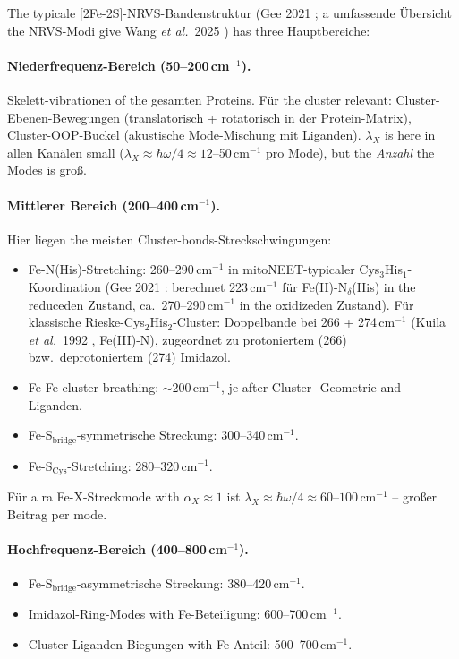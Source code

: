 \documentclass[11pt,a4paper,twoside]{article}
\theoremstyle{remark}
\begin{document}
The typicale [2Fe-2S]-NRVS-Bandenstruktur (Gee 2021 \cite{Gee2021}; 
a umfassende \"Ubersicht the NRVS-Modi give Wang \emph{et al.}\ 
2025 \cite{Wang2025}) has three Hauptbereiche:

\paragraph{Niederfrequenz-Bereich (50--200\,cm$^{-1}$).}
Skelett-vibrationen of the gesamten Proteins. F\"ur the cluster relevant:
Cluster-Ebenen-Bewegungen (translatorisch + rotatorisch in der
Protein-Matrix), Cluster-OOP-Buckel (akustische Mode-Mischung mit
Liganden). $\lambda_X$ is here in allen Kan\"alen small
($\lambda_X \approx \hbar\omega/4 \approx 12$--50\,cm$^{-1}$ pro
Mode), but the \emph{Anzahl} the Modes is gro{\ss}.

\paragraph{Mittlerer Bereich (200--400\,cm$^{-1}$).}
Hier liegen the meisten Cluster-bonds-Streckschwingungen:
\begin{itemize}\setlength{\itemsep}{0pt}
  \item Fe-N(His)-Stretching:
        260--290\,cm$^{-1}$ in mitoNEET-typicaler Cys$_3$His$_1$-
        Koordination (Gee 2021 \cite{Gee2021}: berechnet 223\,cm$^{-1}$
        f\"ur Fe(II)-N$_\delta$(His) in the reduceden Zustand, ca.\
        270--290\,cm$^{-1}$ in the oxidizeden Zustand). F\"ur klassische
        Rieske-Cys$_2$His$_2$-Cluster: Doppelbande bei 266 + 274\,cm$^{-1}$
        (Kuila \emph{et al.}\ 1992 \cite{Kuila1992}, Fe(III)-N), zugeordnet
        zu protoniertem (266) bzw.\ deprotoniertem (274) Imidazol.
  \item Fe-Fe-cluster breathing: $\sim 200$\,cm$^{-1}$, je after Cluster-
        Geometrie and Liganden.
  \item Fe-S$_\text{bridge}$-symmetrische Streckung: 300--340\,cm$^{-1}$.
  \item Fe-S$_\text{Cys}$-Stretching: 280--320\,cm$^{-1}$.
\end{itemize}
F\"ur a ra Fe-X-Streckmode with $\alpha_X \approx 1$ ist
$\lambda_X \approx \hbar\omega/4 \approx 60$--$100$\,cm$^{-1}$ -- gro{\ss}er
Beitrag per mode.

\paragraph{Hochfrequenz-Bereich (400--800\,cm$^{-1}$).}
\begin{itemize}\setlength{\itemsep}{0pt}
  \item Fe-S$_\text{bridge}$-asymmetrische Streckung: 380--420\,cm$^{-1}$.
  \item Imidazol-Ring-Modes with Fe-Beteiligung: 600--700\,cm$^{-1}$.
  \item Cluster-Liganden-Biegungen with Fe-Anteil: 500--700\,cm$^{-1}$.
\end{itemize}
\end{document}
